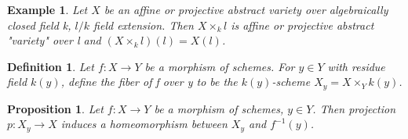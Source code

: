 \documentclass{ctexart}
\newtheorem{definition}{Definition}[section]
\newtheorem{proposition}{Proposition}[section]
\newtheorem{example}{Example}[section]
\begin{document}
\begin{example}
    Let $X$ be an affine or projective abstract variety over algebraically closed field k, $l/k$ field extension.
    Then $X \times_{k} l$ is affine or projective abstract "variety" over l and $(X \times_{k} l)(l) = X(l)$.
\end{example}
\begin{definition}
    Let $f: X \longrightarrow Y$ be a morphism of schemes.
    For $y\in Y$ with residue field $k(y)$, define the fiber of f over y to be the $k(y)$-scheme $X_{y} = X \times_{Y} k(y)$.
\end{definition}
\begin{proposition}
    Let $f: X \longrightarrow Y$ be a morphism of schemes, $y\in Y$.
    Then projection $p: X_{y} \longrightarrow X$ induces a homeomorphism between $X_{y}$ and $f^{-1}(y)$.
    \label{Proposition 2.9}
\end{proposition}
\end{document}
